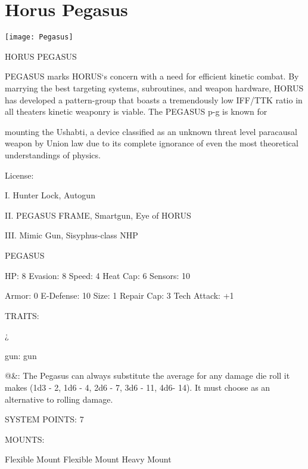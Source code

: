 \section{Horus Pegasus}

\centering\texttt{[image: Pegasus]}

                                         HORUS PEGASUS

PEGASUS marks HORUS‘s concern with a need for efficient kinetic combat. By marrying the best targeting
systems, subroutines, and weapon hardware, HORUS has developed a pattern-group that boasts a
tremendously low IFF/TTK ratio in all theaters kinetic weaponry is viable. The PEGASUS p-g is known for

mounting the Ushabti, a device classified as an unknown threat level paracausal weapon by Union law due
to its complete ignorance of even the most theoretical understandings of physics.

                                                  License:

I. Hunter Lock, Autogun

II. PEGASUS FRAME, Smartgun, Eye of HORUS

III. Mimic Gun, Sisyphus-class NHP





                                                    PEGASUS

  HP: 8           Evasion: 8                              Speed: 4            Heat Cap: 6         Sensors: 10

  Armor: 0        E-Defense: 10                           Size: 1             Repair Cap: 3       Tech Attack:
                                                                                                  +1

                                                      TRAITS:

  ¿%

  gun: gun

  @\&: The Pegasus can always substitute the average for any damage die roll it makes  (1d3 - 2, 1d6 - 4,
  2d6 - 7, 3d6 - 11, 4d6- 14). It must choose as an alternative to rolling damage.

                                                SYSTEM POINTS: 7

                                                     MOUNTS:

  Flexible Mount                      Flexible Mount                          Heavy Mount


